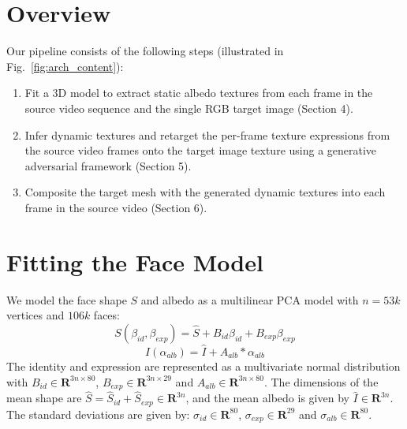 \section{Overview}






Our pipeline consists of the following steps (illustrated in Fig.~\ref{fig:arch_content}):

\begin{enumerate}
\item Fit a 3D model to extract static albedo textures from each frame in the source video sequence and the single RGB target image (Section 4).
\item Infer dynamic textures and retarget the per-frame texture expressions from the source video frames onto the target image texture using a generative adversarial framework (Section 5).
\item Composite the target mesh with the generated dynamic textures into each frame in the source video (Section 6).
\end{enumerate}


\section{Fitting the Face Model}


We model the face shape $S$ and albedo as a multilinear PCA model with $n = 53k$ vertices and $106k$ faces:
\begin{equation}
S(\beta_{id}, \beta_{exp}) = \hat{S} + B_{id}\beta_{id} + B_{exp} \beta_{exp}
\end{equation}
\begin{equation}
I(\alpha_{alb}) = \hat{I} + A_{alb} * \alpha_{alb}
\end{equation}
The identity and expression are represented as a multivariate normal distribution with $B_{id} \in \mathbf{R}^{3n \times 80} $, $B_{exp} \in \mathbf{R}^{3n \times 29}$ and $A_{alb} \in \mathbf{R}^{3n \times 80}$.  The dimensions of the mean shape are $\hat{S} = \hat{S}_{id} + \hat{S}_{exp} \in \mathbf{R}^{3n}$, and the mean albedo is given by $\hat{I} \in \mathbf{R}^{3n}$.  The standard deviations are given by: $\sigma_{id} \in \mathbf{R}^{80}$, $\sigma_{exp} \in \mathbf{R}^{29}$ and $\sigma_{alb} \in \mathbf{R}^{80}$.

